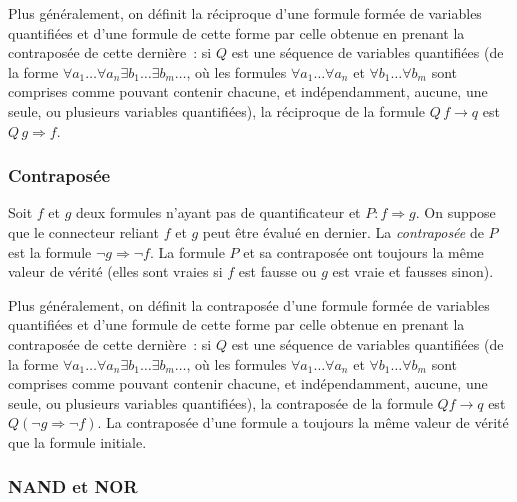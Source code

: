 Plus généralement, on définit la réciproque d'une formule formée de variables quantifiées et d'une formule de cette forme par celle obtenue en prenant la contraposée de cette dernière : si $Q$ est une séquence de variables quantifiées (de la forme $\forall a_1 \dots \forall a_n \exists b_1 \dots \exists b_m \dots$, où les formules $\forall a_1 \dots \forall a_n$ et $\forall b_1 \dots \forall b_m$ sont comprises comme pouvant contenir chacune, et indépendamment, aucune, une seule, ou plusieurs variables quantifiées), la réciproque de la formule $Q \, f \rightarrow q$ est $Q \, g \Rightarrow f$. 

\subsubsection{Contraposée}

Soit $f$ et $g$ deux formules n'ayant pas de quantificateur et $P: f \Rightarrow g$. 
On suppose que le connecteur reliant $f$ et $g$ peut être évalué en dernier.
La \textit{contraposée} de $P$ est la formule $\neg g \Rightarrow \neg f$. 
La formule $P$ et sa contraposée ont toujours la même valeur de vérité (elles sont vraies si $f$ est fausse ou $g$ est vraie et fausses sinon). 

Plus généralement, on définit la contraposée d'une formule formée de variables quantifiées et d'une formule de cette forme par celle obtenue en prenant la contraposée de cette dernière : si $Q$ est une séquence de variables quantifiées (de la forme $\forall a_1 \dots \forall a_n \exists b_1 \dots \exists b_m \dots$, où les formules $\forall a_1 \dots \forall a_n$ et $\forall b_1 \dots \forall b_m$ sont comprises comme pouvant contenir chacune, et indépendamment, aucune, une seule, ou plusieurs variables quantifiées), la contraposée de la formule $Q f \rightarrow q$ est $Q (\neg g \Rightarrow \neg f)$. 
La contraposée d'une formule a toujours la même valeur de vérité que la formule initiale.

\subsubsection{NAND et NOR}

